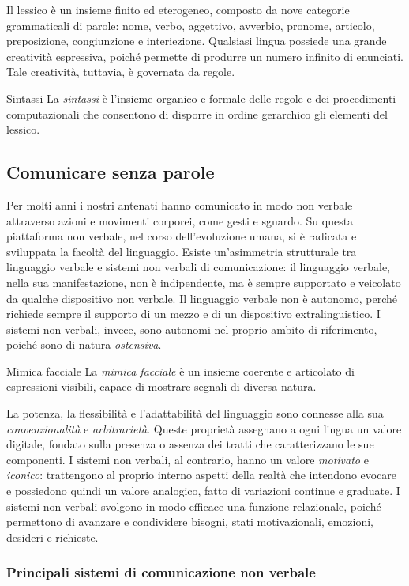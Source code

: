 \documentclass[a4paper]{article}
\begin{document}
Il lessico è un insieme finito ed eterogeneo, composto da nove categorie grammaticali di parole: nome, verbo, aggettivo, avverbio, pronome, articolo, preposizione, congiunzione e interiezione.
Qualsiasi lingua possiede una grande creatività espressiva, poiché permette di produrre un numero infinito di enunciati. Tale creatività, tuttavia, è governata da regole.
\begin{snippetdefinition}{Sintassi}
    La \emph{sintassi} è l'insieme organico e formale delle regole e dei procedimenti computazionali che consentono di disporre in ordine gerarchico gli elementi del lessico.
\end{snippetdefinition}
\subsection{Comunicare senza parole}
Per molti anni i nostri antenati hanno comunicato in modo non verbale attraverso azioni e movimenti corporei, come gesti e sguardo. Su questa piattaforma non verbale, nel corso dell'evoluzione umana, si è radicata e sviluppata la facoltà del linguaggio.
Esiste un'asimmetria strutturale tra linguaggio verbale e sistemi non verbali di comunicazione: il linguaggio verbale, nella sua manifestazione, non è indipendente, ma è sempre supportato e veicolato da qualche dispositivo non verbale.
Il linguaggio verbale non è autonomo, perché richiede sempre il supporto di un mezzo e di un dispositivo extralinguistico. I sistemi non verbali, invece, sono autonomi nel proprio ambito di riferimento, poiché sono di natura \emph{ostensiva}.
\begin{snippetexample}{Mimica facciale}
    La \emph{mimica facciale} è un insieme coerente e articolato di espressioni visibili, capace di mostrare segnali di diversa natura.
\end{snippetexample}
La potenza, la flessibilità e l'adattabilità del linguaggio sono connesse alla sua \emph{convenzionalità} e \emph{arbitrarietà}. Queste proprietà assegnano a ogni lingua un valore digitale, fondato sulla presenza o assenza dei tratti che caratterizzano le sue componenti.
I sistemi non verbali, al contrario, hanno un valore \emph{motivato} e \emph{iconico}: trattengono al proprio interno aspetti della realtà che intendono evocare e possiedono quindi un valore analogico, fatto di variazioni continue e graduate.
I sistemi non verbali svolgono in modo efficace una funzione relazionale, poiché permettono di avanzare e condividere bisogni, stati motivazionali, emozioni, desideri e richieste.
\subsubsection{Principali sistemi di comunicazione non verbale}
\end{document}
